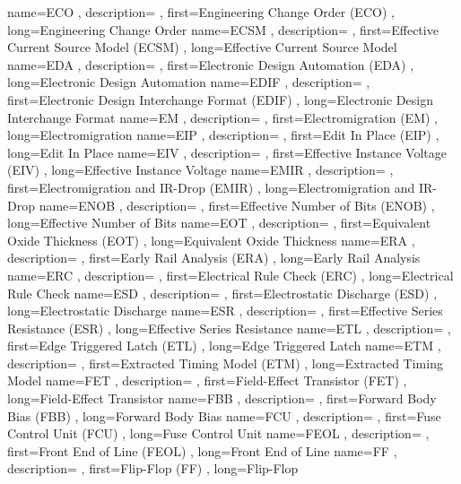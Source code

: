 { name={ECO}
, description={}
, first={Engineering Change Order (ECO)}
, long={Engineering Change Order}
}
{ name={ECSM}
, description={}
, first={Effective Current Source Model (ECSM)}
, long={Effective Current Source Model}
}
{ name={EDA}
, description={}
, first={Electronic Design Automation (EDA)}
, long={Electronic Design Automation}
}
{ name={EDIF}
, description={}
, first={Electronic Design Interchange Format (EDIF)}
, long={Electronic Design Interchange Format}
}
{ name={EM}
, description={}
, first={Electromigration (EM)}
, long={Electromigration}
}
{ name={EIP}
, description={}
, first={Edit In Place (EIP)}
, long={Edit In Place}
}
{ name={EIV}
, description={}
, first={Effective Instance Voltage (EIV)}
, long={Effective Instance Voltage}
}
{ name={EMIR}
, description={}
, first={Electromigration and IR-Drop (EMIR)}
, long={Electromigration and IR-Drop}
}
{ name={ENOB}
, description={}
, first={Effective Number of Bits (ENOB)}
, long={Effective Number of Bits}
}
{ name={EOT}
, description={}
, first={Equivalent Oxide Thickness (EOT)}
, long={Equivalent Oxide Thickness}
}
{ name={ERA}
, description={}
, first={Early Rail Analysis (ERA)}
, long={Early Rail Analysis}
}
{ name={ERC}
, description={}
, first={Electrical Rule Check (ERC)}
, long={Electrical Rule Check}
}
{ name={ESD}
, description={}
, first={Electrostatic Discharge (ESD)}
, long={Electrostatic Discharge}
}
{ name={ESR}
, description={}
, first={Effective Series Resistance (ESR)}
, long={Effective Series Resistance}
}
{ name={ETL}
, description={}
, first={Edge Triggered Latch (ETL)}
, long={Edge Triggered Latch}
}
{ name={ETM}
, description={}
, first={Extracted Timing Model (ETM)}
, long={Extracted Timing Model}
}
{ name={FET}
, description={}
, first={Field-Effect Transistor (FET)}
, long={Field-Effect Transistor}
}
{ name={FBB}
, description={}
, first={Forward Body Bias (FBB)}
, long={Forward Body Bias}
}
{ name={FCU}
, description={}
, first={Fuse Control Unit (FCU)}
, long={Fuse Control Unit}
}
{ name={FEOL}
, description={}
, first={Front End of Line (FEOL)}
, long={Front End of Line}
}
{ name={FF}
, description={}
, first={Flip-Flop (FF)}
, long={Flip-Flop}
}
